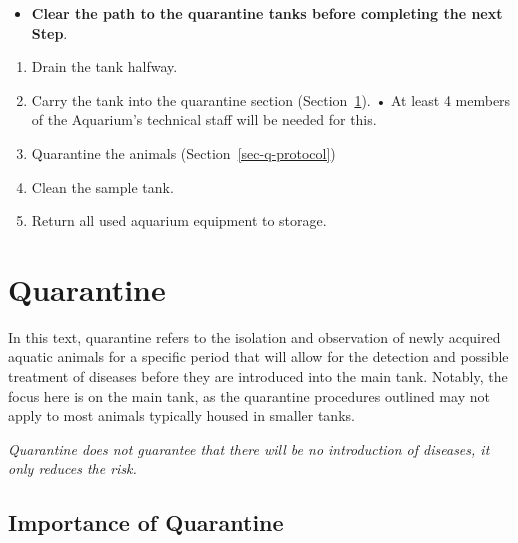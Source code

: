 \documentclass[
  12pt,
]{report}
\providecommand{\tightlist}{%
  \setlength{\itemsep}{0pt}\setlength{\parskip}{0pt}}\usepackage{longtable,booktabs,array}
\begin{document}
\begin{itemize}
\tightlist
\item
  \textbf{Clear the path to the quarantine tanks before completing the
  next Step}.
\end{itemize}

\begin{enumerate}
\def\labelenumi{\arabic{enumi}.}
\setcounter{enumi}{28}
\item
  Drain the tank halfway.
\item
  Carry the tank into the quarantine section
  (Section~\ref{sec-quarantine}). • At least 4 members of the Aquarium's
  technical staff will be needed for this.
\item
  Quarantine the animals (Section~\ref{sec-q-protocol})
\item
  Clean the sample tank.
\item
  Return all used aquarium equipment to storage.
\end{enumerate}

\newpage

\hypertarget{sec-quarantine}{%
\chapter{Quarantine}\label{sec-quarantine}}

In this text, quarantine refers to the isolation and observation of
newly acquired aquatic animals for a specific period that will allow for
the detection and possible treatment of diseases before they are
introduced into the main tank. Notably, the focus here is on the main
tank, as the quarantine procedures outlined may not apply to most
animals typically housed in smaller tanks.

\emph{Quarantine does not guarantee that there will be no introduction
of diseases, it only reduces the risk.}

\hypertarget{importance-of-quarantine}{%
\section{Importance of Quarantine}\label{importance-of-quarantine}}
\end{document}
